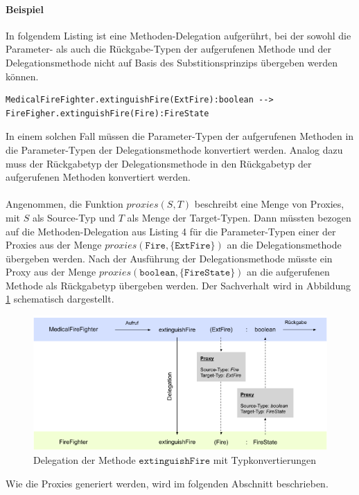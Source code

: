 \documentclass[a4paper,12pt]{article}
\begin{document}
\paragraph{Beispiel} In folgendem Listing ist eine Methoden-Delegation aufgerührt, bei der sowohl die Parameter- als auch die Rückgabe-Typen der aufgerufenen Methode und der Delegationsmethode nicht auf Basis des Substitionsprinzips übergeben werden können.
\begin{lstlisting}[style = dsl, caption = Methoden-Delegation mit Typkonvertierung, captionpos = b]
	MedicalFireFighter.extinguishFire(ExtFire):boolean --> FireFigher.extinguishFire(Fire):FireState
\end{lstlisting}\label{lst:methdel3}
\noindent
In einem solchen Fall müssen die Parameter-Typen der aufgerufenen Methoden in die Parameter-Typen der Delegationsmethode konvertiert werden. Analog dazu muss der Rückgabetyp der Delegationsmethode in den Rückgabetyp der aufgerufenen Methoden konvertiert werden.\\\\
Angenommen, die Funktion $\mathit{proxies(S,T)}$ beschreibt eine Menge von Proxies, mit $S$ als Source-Typ und $T$ als Menge der Target-Typen. Dann müssten bezogen auf die Methoden-Delegation aus Listing 4 für die Parameter-Typen einer der Proxies aus der Menge $\mathit{proxies(\texttt{Fire}, \{\texttt{ExtFire}\})}$ an die Delegationsmethode übergeben werden. Nach der Ausführung der Delegationsmethode müsste ein Proxy aus der Menge $\mathit{proxies(\texttt{boolean},\{\texttt{FireState}\})}$ an die aufgerufenen Methode als Rückgabetyp übergeben werden. Der Sachverhalt wird in Abbildung \ref{fig:DEL_extinguishFire} schematisch dargestellt.
\begin{figure}[H]
\includegraphics[width=\linewidth]{MDEL_extinguishFire}
\caption{Delegation der Methode $\texttt{extinguishFire}$ mit Typkonvertierungen}
\label{fig:DEL_extinguishFire}
\end{figure}
\noindent
Wie die Proxies generiert werden, wird im folgenden Abschnitt beschrieben.
\end{document}
